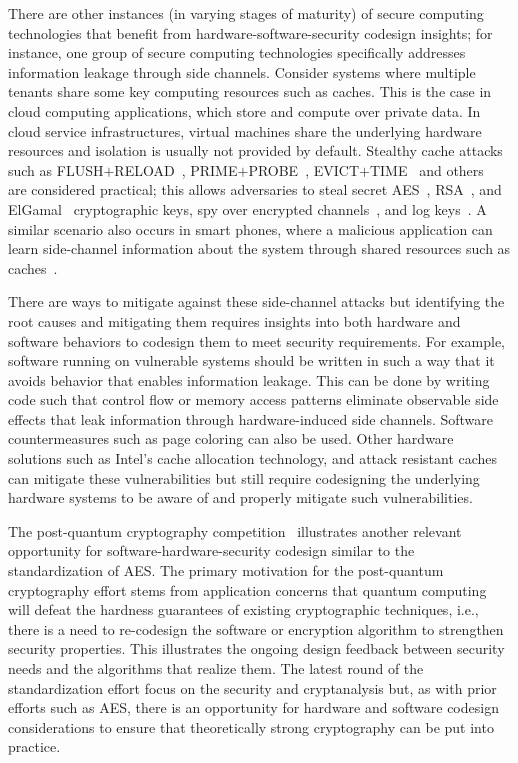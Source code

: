There are other instances (in varying stages of maturity) of secure computing technologies that benefit from hardware-software-security codesign insights; for instance, one group of secure computing technologies specifically addresses information leakage through side channels.
Consider systems where multiple tenants share some key computing resources such as caches.
This is the case in cloud computing applications, which store and compute over private data.
In cloud service infrastructures, virtual machines share the underlying hardware resources and isolation is usually not provided by default.
Stealthy cache attacks such as
  FLUSH$+$RELOAD~\cite{gruss2016flush, gullasch2011cache, yarom2014flush}, PRIME$+$PROBE~\cite{irazoqui2015s, kayaalp2016high, liu2015last, osvik2006cache, percival2005cache},
  EVICT$+$TIME~\cite{osvik2006cache} and
  others~\cite{disselkoen2017prime} are considered practical; this allows adversaries to steal secret AES~\cite{kayaalp2016high}, RSA~\cite{yarom2014flush}, and ElGamal~\cite{liu2015last} cryptographic keys, spy over encrypted channels~\cite{irazoqui2015lucky}, and log keys~\cite{gruss2015cache}.
A similar scenario also occurs in smart phones, where a malicious application can learn side-channel information about the system through shared resources such as caches~\cite{lipp2016armageddon}.

There are ways to mitigate against these side-channel attacks but identifying the root causes and mitigating them requires insights into both hardware and software behaviors to codesign them to meet security requirements.
For example, software running on vulnerable systems should be written in such a way that it avoids behavior that enables information leakage.
This can be done by writing code such that control flow or memory access patterns eliminate observable side effects that leak information through hardware-induced side channels.
Software countermeasures such as page coloring can also be used.
Other hardware solutions such as Intel's cache allocation technology, and attack resistant caches~\cite{liu2016newcache, wang2008novel, liu2014random} can mitigate these vulnerabilities but still require codesigning the underlying hardware systems to be aware of and properly mitigate such vulnerabilities.

The post-quantum cryptography competition~\cite{nist-quantum, nist-quantum2} illustrates another relevant opportunity for software-hardware-security codesign similar to the standardization of AES.
The primary motivation for the post-quantum cryptography effort stems from application concerns that quantum computing will defeat the hardness guarantees of existing cryptographic techniques, i.e., there is a need to re-codesign the software or encryption algorithm to strengthen security properties.
This illustrates the ongoing design feedback between security needs and the algorithms that realize them.
The latest round of the standardization effort focus on the security and cryptanalysis but, as with prior efforts such as AES, there is an opportunity for hardware and software codesign considerations to ensure that theoretically strong cryptography can be put into practice.
